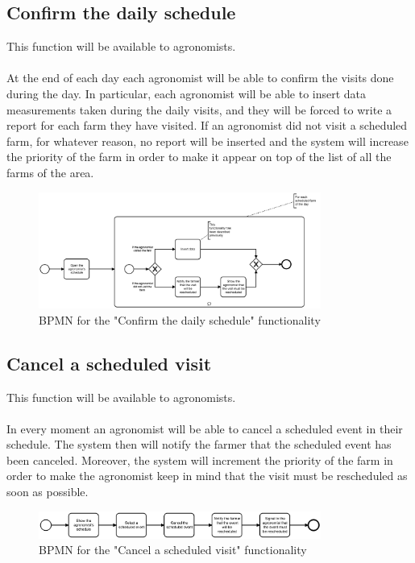 \documentclass[10pt]{report}
\begin{document}
\subsection{Confirm the daily schedule}
This function will be available to agronomists.\\ \\
At the end of each day each agronomist will be able to confirm the visits done during the day. In particular, each agronomist will be able to insert data measurements taken during the daily visits, and they will be forced to write a report for each farm they have visited. If an agronomist did not visit a scheduled farm, for whatever reason, no report will be inserted and the system will increase the priority of the farm in order to make it appear on top of the list of all the farms of the area.
\begin{figure}[H]
    \centering
    \includegraphics[width=350px]{BPMN/BPMN 228.jpg}
    \caption{BPMN for the "Confirm the daily schedule" functionality}
\end{figure}
\subsection{Cancel a scheduled visit}
This function will be available to agronomists.\\ \\
In every moment an agronomist will be able to cancel a scheduled event in their schedule. The system then will notify the farmer that the scheduled event has been canceled. Moreover, the system will increment the priority of the farm in order to make the agronomist keep in mind that the visit must be rescheduled as soon as possible.
\begin{figure}[H]
    \centering
    \includegraphics[width=350px]{BPMN/BPMN 229.jpg}
    \caption{BPMN for the "Cancel a scheduled visit" functionality}
\end{figure}
\end{document}
